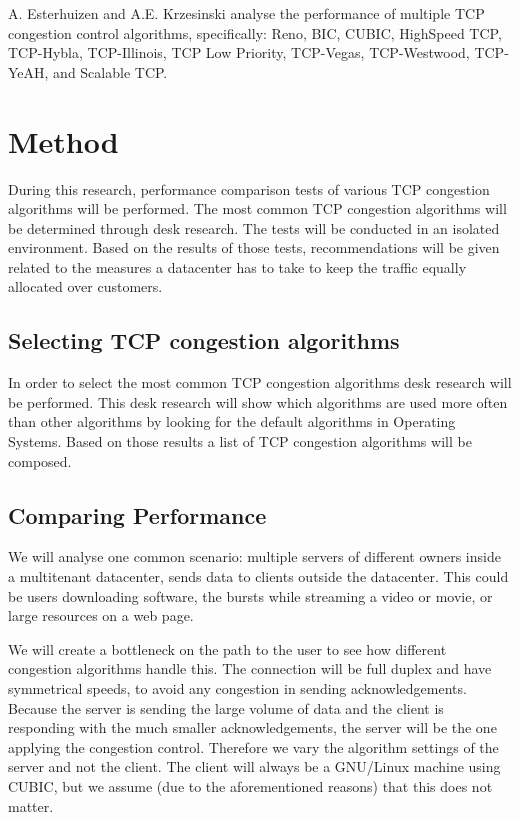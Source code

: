 \documentclass{article}
\begin{document}
A. Esterhuizen and A.E. Krzesinski\cite{multiple-congestion} analyse the
performance of multiple TCP congestion control algorithms, specifically: Reno,
BIC, CUBIC, HighSpeed TCP, TCP-Hybla, TCP-Illinois, TCP Low Priority,
TCP-Vegas, TCP-Westwood, TCP-YeAH, and Scalable TCP.


\section{Method}\label{sec:method}

During this research, performance comparison tests of various TCP congestion algorithms will be performed. The most common TCP congestion algorithms will be determined through desk research. The tests will be conducted in an isolated environment. Based on the results of those tests, recommendations will be given related to the measures a datacenter has to take to keep the traffic equally allocated over customers.


\subsection{Selecting TCP congestion algorithms}

In order to select the most common TCP congestion algorithms desk research will be performed. This desk research will show which algorithms are used more often than other algorithms by looking for the default algorithms in Operating Systems. Based on those results a list of TCP congestion algorithms will be composed.


\subsection{Comparing Performance}

We will analyse one common scenario: multiple servers of different owners
inside a multitenant datacenter, sends data to clients outside the datacenter.
This could be users downloading software, the bursts while streaming a video
or movie, or large resources on a web page.

We will create a bottleneck on the path to the user to see how different
congestion algorithms handle this. The connection will be full duplex and have
symmetrical speeds, to avoid any congestion in sending acknowledgements.
Because the server is sending the large volume of data and the client is
responding with the much smaller acknowledgements, the server will be the one
applying the congestion control. Therefore we vary the algorithm settings of
the server and not the client. The client will always be a GNU/Linux machine
using CUBIC, but we assume (due to the aforementioned reasons) that this does
not matter.
\end{document}
